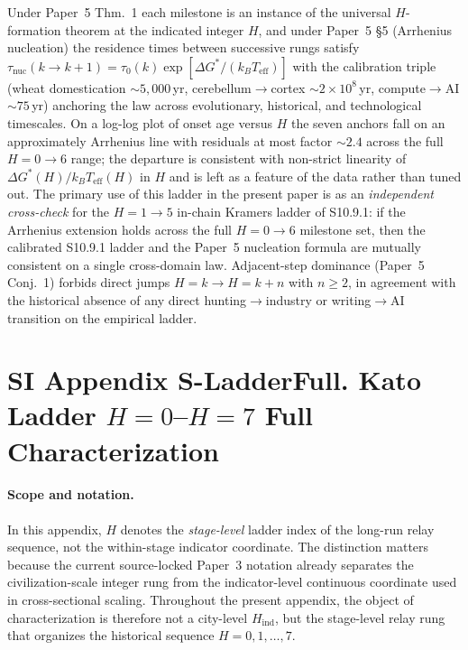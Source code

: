 \documentclass[11pt]{article}
\begin{document}
Under Paper~5 Thm.~1 each milestone is an instance of the universal $H$-formation theorem at the indicated integer $H$, and under Paper~5 \S5 (Arrhenius nucleation) the residence times between successive rungs satisfy $\tau_{\mathrm{nuc}}(k\to k{+}1)=\tau_0(k)\exp[\Delta G^{*}/(k_BT_{\mathrm{eff}})]$ with the calibration triple (wheat domestication $\sim 5{,}000$\,yr, cerebellum$\to$cortex $\sim 2{\times}10^{8}$\,yr, compute$\to$AI $\sim 75$\,yr) anchoring the law across evolutionary, historical, and technological timescales.  On a log-log plot of onset age versus $H$ the seven anchors fall on an approximately Arrhenius line with residuals at most factor $\sim 2.4$ across the full $H{=}0{\to}6$ range; the departure is consistent with non-strict linearity of $\Delta G^{*}(H)/k_BT_{\mathrm{eff}}(H)$ in $H$ and is left as a feature of the data rather than tuned out.  The primary use of this ladder in the present paper is as an \emph{independent cross-check} for the $H{=}1\to 5$ in-chain Kramers ladder of S10.9.1: if the Arrhenius extension holds across the full $H{=}0\to 6$ milestone set, then the calibrated S10.9.1 ladder and the Paper~5 nucleation formula are mutually consistent on a single cross-domain law.  Adjacent-step dominance (Paper~5 Conj.~1) forbids direct jumps $H{=}k\to H{=}k{+}n$ with $n\ge 2$, in agreement with the historical absence of any direct hunting$\to$industry or writing$\to$AI transition on the empirical ladder.



\section*{SI Appendix S-LadderFull. Kato Ladder $H{=}0$--$H{=}7$ Full Characterization}
\label{sec:S-LadderFull}

\paragraph{Scope and notation.}
In this appendix, $H$ denotes the \emph{stage-level} ladder index of the
long-run relay sequence, not the within-stage indicator coordinate.
The distinction matters because the current source-locked Paper~3 notation
already separates the civilization-scale integer rung from the indicator-level
continuous coordinate used in cross-sectional scaling.
Throughout the present appendix, the object of characterization is therefore
not a city-level $H_{\mathrm{ind}}$, but the stage-level relay rung that
organizes the historical sequence
$H{=}0,1,\ldots,7$.
\end{document}
